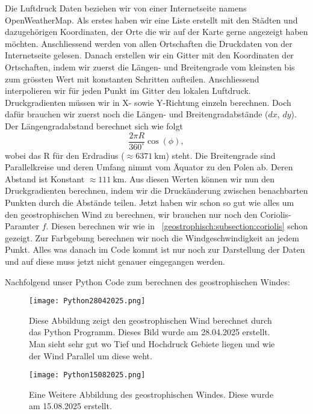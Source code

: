 Die Luftdruck Daten beziehen wir von einer Internetseite namens OpenWeatherMap.
Als erstes haben wir eine Liste erstellt mit den Städten und dazugehörigen Koordinaten, der Orte die wir auf der Karte gerne angezeigt haben möchten.
Anschliessend werden von allen Ortschaften die Druckdaten von der Internetseite gelesen.
Danach erstellen wir ein Gitter mit den Koordinaten der Ortschaften, indem wir zuerst die Längen- und Breitengrade vom kleinsten bis zum grössten Wert mit konstanten Schritten aufteilen.
Anschliessend interpolieren wir für jeden Punkt im Gitter den lokalen Luftdruck.
Druckgradienten müssen wir in X- sowie Y-Richtung einzeln berechnen.
Doch dafür brauchen wir zuerst noch die Längen- und Breitengradabstände ($dx$, $dy$).
Der Längengradabstand berechnet sich wie folgt
\begin{equation}
	\frac{2 \pi R}{360^\circ} \cos(\phi), 
\end{equation}
wobei das R für den Erdradius ($\approx\SI{6371}{\kilo\meter}$) steht. 
Die Breitengrade sind Parallelkreise und deren Umfang nimmt vom Äquator zu den Polen ab.
Deren Abstand ist Konstant $\approx\SI{111}{\kilo\meter}$.
Aus diesen Werten können wir nun den Druckgradienten berechnen, indem wir die Druckänderung zwischen benachbarten Punkten durch die Abstände teilen.
Jetzt haben wir schon so gut wie alles um den geostrophischen Wind zu berechnen, wir brauchen nur noch den Coriolis-Paramter $f$.
Diesen berechnen wir wie in ~\ref{geostrophisch:subsection:coriolis} schon gezeigt. 
Zur Farbgebung berechnen wir noch die Windgeschwindigkeit an jedem Punkt. 
Alles was danach im Code kommt ist nur noch zur Darstellung der Daten und auf diese muss jetzt nicht genauer eingegangen werden.

Nachfolgend unser Python Code zum berechnen des geostrophischen Windes: 


\begin{figure}
	\centering
	\texttt{[image: Python28042025.png]}
	\caption{Diese Abbildung zeigt den geostrophischen Wind berechnet durch das Python Programm.
	Dieses Bild wurde am 28.04.2025 erstellt.
	Man sieht sehr gut wo Tief und Hochdruck Gebiete liegen und wie der Wind Parallel um diese weht.}
	\label{bild:28042025}
\end{figure}

\begin{figure}
	\centering
	\texttt{[image: Python15082025.png]}
	\caption{Eine Weitere Abbildung des geostrophischen Windes.
	Diese wurde am 15.08.2025 erstellt.
	}
	\label{bild:15082025}
\end{figure}


